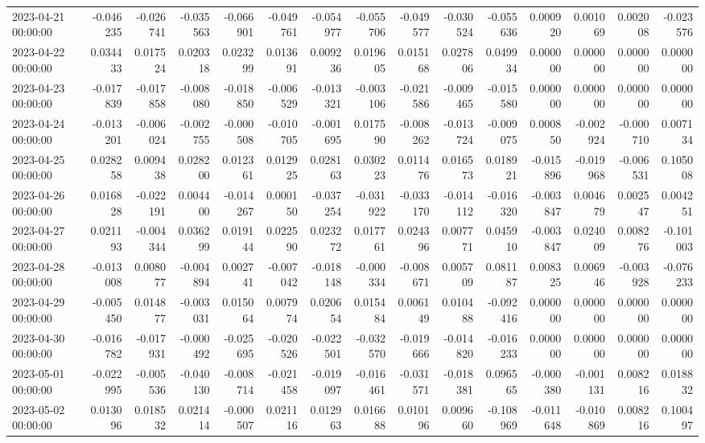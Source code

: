 \begin{tabular}{lrrrrrrrrrrrrrr}
2023-04-21 00:00:00 & -0.046235 & -0.026741 & -0.035563 & -0.066901 & -0.049761 & -0.054977 & -0.055706 & -0.049577 & -0.030524 & -0.055636 & 0.000920 & 0.001069 & 0.002008 & -0.023576 \\
2023-04-22 00:00:00 & 0.034433 & 0.017524 & 0.020318 & 0.023299 & 0.013691 & 0.009236 & 0.019605 & 0.015168 & 0.027806 & 0.049934 & 0.000000 & 0.000000 & 0.000000 & 0.000000 \\
2023-04-23 00:00:00 & -0.017839 & -0.017858 & -0.008080 & -0.018850 & -0.006529 & -0.013321 & -0.003106 & -0.021586 & -0.009465 & -0.015580 & 0.000000 & 0.000000 & 0.000000 & 0.000000 \\
2023-04-24 00:00:00 & -0.013201 & -0.006024 & -0.002755 & -0.000508 & -0.010705 & -0.001695 & 0.017590 & -0.008262 & -0.013724 & -0.009075 & 0.000850 & -0.002924 & -0.000710 & 0.007134 \\
2023-04-25 00:00:00 & 0.028258 & 0.009438 & 0.028200 & 0.012361 & 0.012925 & 0.028163 & 0.030223 & 0.011476 & 0.016573 & 0.018921 & -0.015896 & -0.019968 & -0.006531 & 0.105008 \\
2023-04-26 00:00:00 & 0.016828 & -0.022191 & 0.004400 & -0.014267 & 0.000150 & -0.037254 & -0.031922 & -0.033170 & -0.014112 & -0.016320 & -0.003847 & 0.004679 & 0.002547 & 0.004251 \\
2023-04-27 00:00:00 & 0.021193 & -0.004344 & 0.036299 & 0.019144 & 0.022590 & 0.023272 & 0.017761 & 0.024396 & 0.007771 & 0.045910 & -0.003847 & 0.024009 & 0.008276 & -0.101003 \\
2023-04-28 00:00:00 & -0.013008 & 0.008077 & -0.004894 & 0.002741 & -0.007042 & -0.018148 & -0.000334 & -0.008671 & 0.005709 & 0.081187 & 0.008325 & 0.006946 & -0.003928 & -0.076233 \\
2023-04-29 00:00:00 & -0.005450 & 0.014877 & -0.003031 & 0.015064 & 0.007974 & 0.020654 & 0.015484 & 0.006149 & 0.010488 & -0.092416 & 0.000000 & 0.000000 & 0.000000 & 0.000000 \\
2023-04-30 00:00:00 & -0.016782 & -0.017931 & -0.000492 & -0.025695 & -0.020526 & -0.022501 & -0.032570 & -0.019666 & -0.014820 & -0.016233 & 0.000000 & 0.000000 & 0.000000 & 0.000000 \\
2023-05-01 00:00:00 & -0.022995 & -0.005536 & -0.040130 & -0.008714 & -0.021458 & -0.019097 & -0.016461 & -0.031571 & -0.018381 & 0.096565 & -0.000380 & -0.001131 & 0.008216 & 0.018832 \\
2023-05-02 00:00:00 & 0.013096 & 0.018532 & 0.021414 & -0.000507 & 0.021116 & 0.012963 & 0.016688 & 0.010196 & 0.009660 & -0.108969 & -0.011648 & -0.010869 & 0.008216 & 0.100497 \\

\end{tabular}
